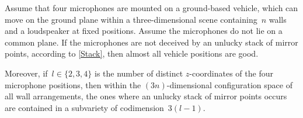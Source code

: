 \documentclass[reqno]{amsart}
\begin{document}


\begin{theorem} \label{2tMain}%
  Assume that four microphones are mounted on a ground-based vehicle,
  which can move on the ground plane within a three-dimensional scene containing~$n$ walls and
  a loudspeaker at fixed positions. Assume the microphones do not lie on a common plane. If the microphones are not deceived by an unlucky stack of mirror points, according to \cref{Stack}, then almost all vehicle positions are good.

  Moreover, if~$l \in \{2,3,4\}$ is the number of distinct
  $z$-coordinates of the four microphone positions, then within
  the
  $(3n)$-dimensional configuration space of all wall arrangements, the
  ones where an unlucky stack of mirror points occurs are contained in a subvariety of codimension~$3 (l-1)$.

\end{theorem}
\end{document}
